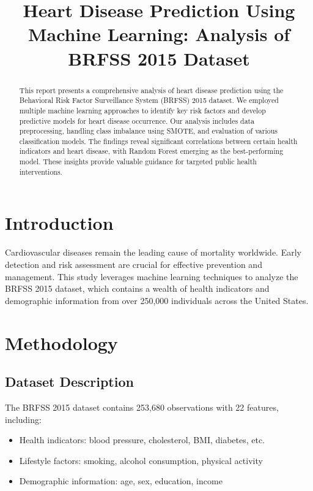 \documentclass[conference]{IEEEtran}
\begin{document}
\title{Heart Disease Prediction Using Machine Learning: Analysis of BRFSS 2015 Dataset}

\author{
}

\maketitle

\begin{abstract}
This report presents a comprehensive analysis of heart disease prediction using the Behavioral Risk Factor Surveillance System (BRFSS) 2015 dataset. We employed multiple machine learning approaches to identify key risk factors and develop predictive models for heart disease occurrence. Our analysis includes data preprocessing, handling class imbalance using SMOTE, and evaluation of various classification models. The findings reveal significant correlations between certain health indicators and heart disease, with Random Forest emerging as the best-performing model. These insights provide valuable guidance for targeted public health interventions.
\end{abstract}

\section{Introduction}
Cardiovascular diseases remain the leading cause of mortality worldwide. Early detection and risk assessment are crucial for effective prevention and management. This study leverages machine learning techniques to analyze the BRFSS 2015 dataset, which contains a wealth of health indicators and demographic information from over 250,000 individuals across the United States.

\section{Methodology}

\subsection{Dataset Description}
The BRFSS 2015 dataset contains 253,680 observations with 22 features, including:
\begin{itemize}
    \item Health indicators: blood pressure, cholesterol, BMI, diabetes, etc.
    \item Lifestyle factors: smoking, alcohol consumption, physical activity
    \item Demographic information: age, sex, education, income
\end{itemize}
\end{document}

